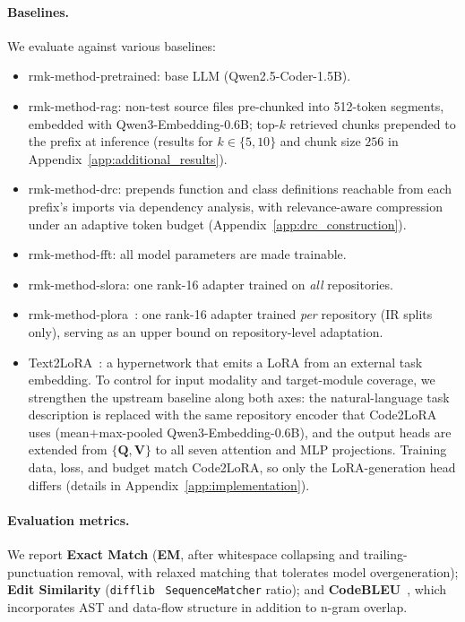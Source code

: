 \documentclass{llmxive}
\providecommand{\UseMacro}[1]{\csname rmk-#1\endcsname}
\providecommand{\codelora}{Code2LoRA\xspace}
\providecommand{\textlora}{Text2LoRA\xspace}
\begin{document}
\paragraph{Baselines.}
We evaluate against various baselines:
\begin{itemize}[topsep=3pt,itemsep=1ex,partopsep=0ex,parsep=0ex,leftmargin=*]
\item \UseMacro{method-pretrained}: base LLM (Qwen2.5-Coder-1.5B).
\item \UseMacro{method-rag}: non-test source files pre-chunked into 512-token segments, embedded with Qwen3-Embedding-0.6B; top-$k$ retrieved chunks prepended to the prefix at inference (results for $k\!\in\!\{5,10\}$ and chunk size $256$ in Appendix~\ref{app:additional_results}).
\item \UseMacro{method-drc}\label{sec:setup:drc}\label{sec:benchmark:oracle}: prepends function and class definitions reachable from each prefix's imports via dependency analysis, with relevance-aware compression under an adaptive token budget (Appendix~\ref{app:drc_construction}).
\item \UseMacro{method-fft}: all model parameters are made trainable. %
\item \UseMacro{method-slora}: one rank-16 adapter trained on \emph{all} repositories.
\item \UseMacro{method-plora}~\cite{zong2025mixlanguageexperts}: one rank-16 adapter trained \emph{per} repository (IR splits only), serving as an upper bound on repository-level adaptation.
\item \textlora{}~\cite{charakorn2025text2lora}: a hypernetwork that emits a LoRA from an external task embedding.
To control for input modality and target-module coverage, we strengthen the upstream baseline along both axes: the natural-language task description is replaced with the same repository encoder that \codelora{} uses (mean$+$max-pooled Qwen3-Embedding-0.6B), and the output heads are extended from $\{\mathbf{Q},\mathbf{V}\}$ to all seven attention and MLP projections.
Training data, loss, and budget match \codelora{}, so only the LoRA-generation head differs (details in Appendix~\ref{app:implementation}).
\end{itemize}

\paragraph{Evaluation metrics.}
\label{sec:setup:metrics}
We report \textbf{Exact Match} (\textbf{EM}, after whitespace collapsing and trailing-punctuation removal, with relaxed matching that tolerates model overgeneration); \textbf{Edit Similarity} (\texttt{difflib}~\cite{python_difflib} \texttt{SequenceMatcher} ratio); and \textbf{CodeBLEU}~\cite{ren2020codebleu}, which incorporates AST and data-flow structure in addition to n-gram overlap.
\end{document}
